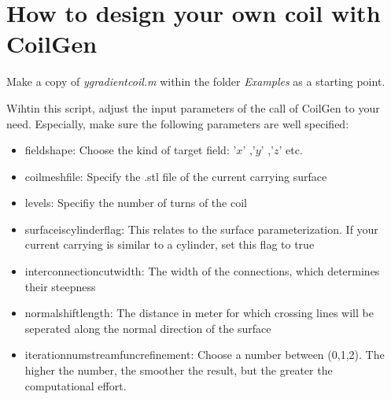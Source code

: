 \documentclass[a4paper,12pt]{book}
\begin{document}
\newpage

\section{How to design your own coil with CoilGen}

Make a copy of \textit{y\textunderscore gradient\textunderscore coil.m} within the folder \textit{Examples} as a starting point. 

Wihtin this script, adjust the input parameters of the call of CoilGen to your need.  Especially, make sure the following parameters are well specified:

\begin{itemize}
	\item field\textunderscore shape: Choose the kind of target field: '$x$' ,'$y$' ,'$z$'  etc.
	\item coil\textunderscore mesh\textunderscore file: Specify the .stl file of the current carrying surface
	\item levels: Specifiy the number of turns of the coil
	\item surface\textunderscore is\textunderscore cylinder\textunderscore flag: This relates to the surface parameterization. If your current carrying is similar to a cylinder, set this flag to true
	\item interconnection\textunderscore cut\textunderscore width: The width of the connections, which determines their steepness
	\item normal\textunderscore shift\textunderscore length: The distance in meter for which crossing lines will be seperated along the normal direction of the surface
	\item iteration\textunderscore num\textunderscore stream\textunderscore func\textunderscore refinement: Choose a number between (0,1,2). The higher the number, the smoother the result, but the greater the computational effort.
\end{itemize}
\end{document}
